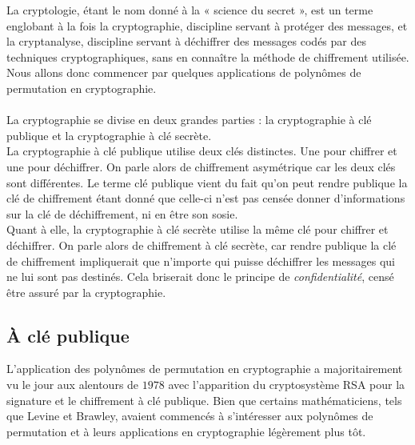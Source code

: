 \documentclass[12pt]{article}
\theoremstyle{remark}\newtheorem{note}{Note}
\theoremstyle{remark}\newtheorem{nota}{Notation}
\theoremstyle{definition}
\begin{document}
La cryptologie, étant le nom donné à la « science du secret », est un terme englobant à la fois la cryptographie, discipline servant à protéger des messages, et la cryptanalyse, discipline servant à déchiffrer des messages codés par des techniques cryptographiques, sans en connaître la méthode de chiffrement utilisée.\\
Nous allons donc commencer par quelques applications de polynômes de permutation en cryptographie.\\\\
La cryptographie se divise en deux grandes parties : la cryptographie à clé publique et la cryptographie à clé secrète.\\
La cryptographie à clé publique utilise deux clés distinctes. Une pour chiffrer et une pour déchiffrer. On parle alors de chiffrement asymétrique car les deux clés sont différentes. Le terme clé publique vient du fait qu'on peut rendre publique la clé de chiffrement étant donné que celle-ci n'est pas censée donner d'informations sur la clé de déchiffrement, ni en être son sosie.\\
Quant à elle, la cryptographie à clé secrète utilise la même clé pour chiffrer et déchiffrer. On parle alors de chiffrement à clé secrète, car rendre publique la clé de chiffrement impliquerait que n'importe qui puisse déchiffrer les messages qui ne lui sont pas destinés. Cela briserait donc le principe de \textit{confidentialité}, censé être assuré par la cryptographie.
\subsection{À clé publique}

L'application des polynômes de permutation en cryptographie a majoritairement vu le jour aux alentours de $1978$ avec l'apparition du cryptosystème RSA pour la signature et le chiffrement à clé publique. Bien que certains mathématiciens, tels que Levine et Brawley, avaient commencés à s'intéresser aux polynômes de permutation et à leurs applications en cryptographie légèrement plus tôt.
\end{document}
